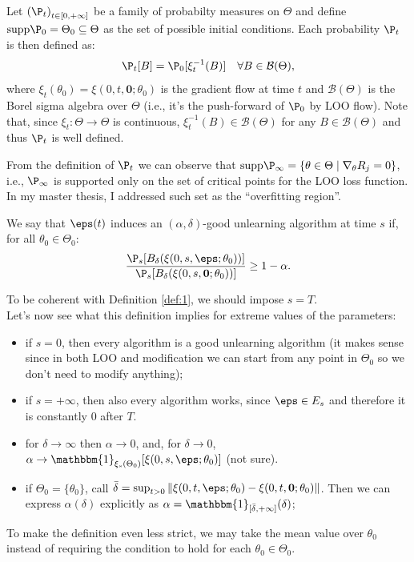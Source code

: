 Let $\left(\P_t\right)_{t\in [0,+\infty]}$ be a family of probabilty measures on $\Theta$ and define $\mathrm{supp}\P_0=\Theta_0\subseteq\Theta$ as the set of possible initial conditions.
Each probability $\P_t$ is then defined as: 
$$\P_t[B] = \P_0[\xi_t^{-1}(B)] \quad \forall B\in\mathcal{B}(\Theta),$$
where $\xi_t(\theta_0) = \xi(0,t,\boldsymbol{0};\theta_0)$ is the gradient flow at time $t$ and $\mathcal{B}(\Theta)$ is the Borel sigma algebra over $\Theta$ (i.e., it's the push-forward of $\P_0$ by LOO flow).
Note that, since $\xi_t:\Theta\to\Theta$ is continuous, $\xi_t^{-1}(B)\in\mathcal{B}(\Theta)$ for any $B\in\mathcal{B}(\Theta)$ and thus $\P_t$ is well defined.
\begin{remark}
    From the definition of $\P_t$ we can observe that $\mathrm{supp}\P_\infty=\{\theta \in \Theta \mid \nabla_\theta R_j = 0\}$, i.e., $\P_\infty$ is supported only on the set of critical points for the LOO loss function. \\
    In my master thesis, I addressed such set as the ``overfitting region''.
\end{remark}
\begin{definition*}\label{def:2}
    We say that $\eps(t)$ induces an $(\alpha,\delta)$-good unlearning algorithm at time $s$ if, for all $\theta_0\in\Theta_0$:
    $$ \frac{\P_s[B_\delta(\xi(0,s,\eps;\theta_0))]}{\P_s[B_\delta(\xi(0,s,\boldsymbol{0};\theta_0))]} \ge 1-\alpha.$$
\end{definition*}
\noindent
To be coherent with Definition \ref{def:1}, we should impose $s=T$.\\
Let's now see what this definition implies for extreme values of the parameters:
\begin{itemize}
  \item if $s=0$, then every algorithm is a good unlearning algorithm (it makes sense since in both LOO and modification we can start from any point in $\Theta_0$ so we don't need to modify anything);
  \item if $s=+\infty$, then also every algorithm works, since $\eps\in E_s$ and therefore it is constantly $0$ after $T$.
  \item for $\delta\to\infty$ then $\alpha\to 0$, and, for $\delta\to0$, $\alpha\to \mathbbm{1}_{\xi_s(\Theta_0)}[\xi(0,s,\eps;\theta_0)]$ (not sure).
  \item if $\Theta_0=\{\theta_0\}$, call $\bar{\delta}=\sup_{t>0}\|\xi(0,t,\eps;\theta_0)-\xi(0,t,\boldsymbol{0};\theta_0)\|$. 
  Then we can express $\alpha(\delta)$ explicitly as $\alpha=\mathbbm{1}_{[\bar{\delta},+\infty]}(\delta)$;
\end{itemize}
To make the definition even less strict, we may take the mean value over $\theta_0$ instead of requiring the condition to hold for each $\theta_0\in\Theta_0$.

